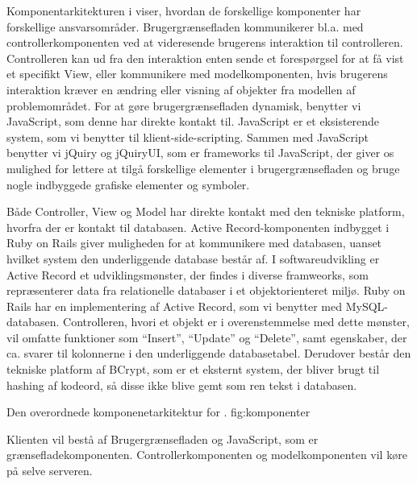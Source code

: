 Komponentarkitekturen i  viser, hvordan de forskellige komponenter har forskellige ansvarsområder. Brugergrænsefladen kommunikerer bl.a. med controllerkomponenten ved at videresende brugerens interaktion til controlleren. Controlleren kan ud fra den interaktion enten sende et forespørgsel for at få vist et specifikt View, eller kommunikere med modelkomponenten, hvis brugerens interaktion kræver en ændring eller visning af objekter fra modellen af problemområdet. For at gøre brugergrænsefladen dynamisk, benytter vi JavaScript, som denne har direkte kontakt til. JavaScript er et eksisterende system, som vi benytter til klient-side-scripting. Sammen med JavaScript benytter vi jQuiry og jQuiryUI, som er frameworks til JavaScript, der giver os mulighed for lettere at tilgå forskellige elementer i brugergrænsefladen og bruge nogle indbyggede grafiske elementer og symboler.


  Både Controller, View og Model har direkte kontakt med den tekniske platform, hvorfra der er kontakt til databasen. Active Record-komponenten indbygget i Ruby on Rails giver muligheden for at kommunikere med databasen, uanset hvilket system den underliggende database består af. I softwareudvikling er Active Record et udviklingsmønster, der findes i diverse framweorks, som repræsenterer data fra relationelle databaser i et objektorienteret miljø. Ruby on Rails har en implementering af Active Record, som vi benytter med MySQL-databasen. Controlleren, hvori et objekt er i overenstemmelse med dette mønster, vil omfatte funktioner som ``Insert'', ``Update'' og ``Delete'', samt egenskaber, der ca. svarer til kolonnerne i den underliggende databasetabel\cite{activerecordwiki}. Derudover består den tekniske platform af BCrypt, som er et eksternt system, der bliver brugt til hashing af kodeord, så disse ikke blive gemt som ren tekst i databasen.


	{Den overordnede komponenetarkitektur for \Foodl{}.}
	{fig:komponenter}


Klienten vil bestå af Brugergrænsefladen og JavaScript, som er grænsefladekomponenten. Controllerkomponenten og modelkomponenten vil køre på selve serveren.
